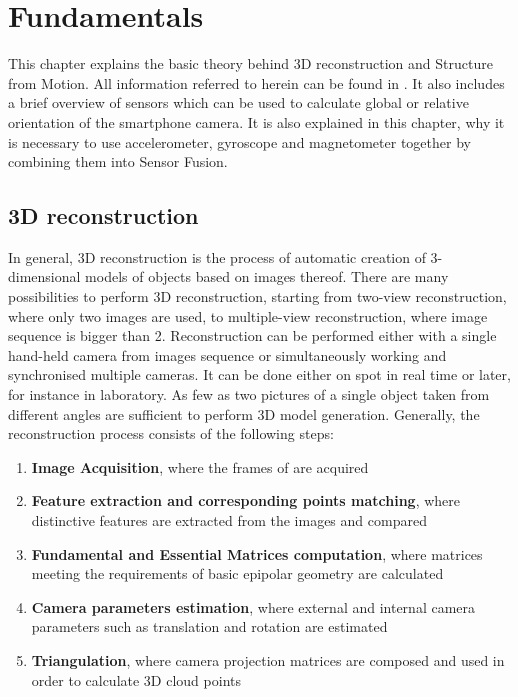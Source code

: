 \ifpdf
    \graphicspath{{figures/}{figures/comparisons}}
\else
    \graphicspath{{figures/}{figures/comparisons}}
\fi


\chapter{Fundamentals} %
This chapter explains the basic theory behind 3D reconstruction and Structure from Motion. All information referred to herein can be found in \cite{HartleyMultipleView}. It also includes a brief overview of sensors which can be used to calculate global or relative orientation of the smartphone camera. It is also explained in this chapter, why it is necessary to use accelerometer, gyroscope and magnetometer together by combining them into Sensor Fusion. 

\section{3D reconstruction}
In general, 3D reconstruction is the process of automatic creation of 3-dimensional models of objects based on images thereof. There are many possibilities to perform 3D reconstruction, starting from two-view reconstruction, where only two images are used, to multiple-view reconstruction, where image sequence is bigger than 2. Reconstruction can be performed either with a single hand-held camera from images sequence or simultaneously working and synchronised multiple cameras. It can be done either on spot in real time or later, for instance in laboratory. As few as two pictures of a single object taken from different angles are sufficient to perform 3D model generation. Generally, the reconstruction process consists of the following steps:
\begin{enumerate}
\item \textbf{Image Acquisition}, where the frames of are acquired 
\item \textbf{Feature extraction and corresponding points matching}, where distinctive features are extracted from the images and compared
\item \textbf{Fundamental and Essential Matrices computation}, where matrices meeting the requirements of basic epipolar geometry are calculated
\item \textbf{Camera parameters estimation}, where external and internal camera parameters such as translation and rotation are estimated
\item \textbf{Triangulation}, where camera projection matrices are composed and used in order to calculate 3D cloud points
\end{enumerate}
